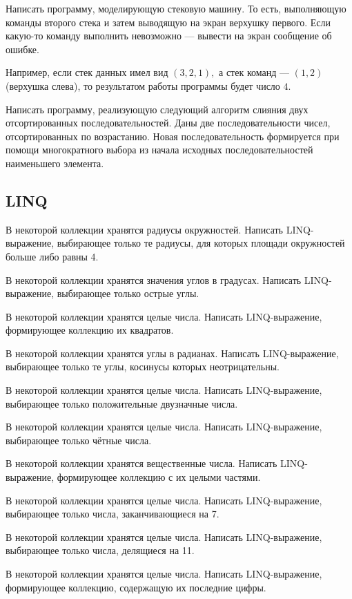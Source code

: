 Написать программу, моделирующую стековую машину. То есть, выполняющую команды второго стека и затем выводящую
на экран верхушку первого. Если какую-то команду выполнить невозможно
— вывести на экран сообщение об ошибке.

Например, если стек данных имел вид $(3, 2, 1),$ а стек команд —
$(1, 2)$ (верхушка слева), то результатом работы программы будет число
$4$.

\task Написать программу, реализующую следующий алгоритм слияния двух
отсортированных последовательностей. Даны две последовательности
чисел, отсортированных по возрастанию. Новая последовательность
формируется при помощи многократного выбора из начала исходных
последовательностей наименьшего элемента.


\subsection{LINQ}

\task В некоторой коллекции хранятся радиусы окружностей. Написать
LINQ-выражение, выбирающее только те радиусы, для которых площади
окружностей больше либо равны 4.

\task В некоторой коллекции хранятся значения углов в
градусах. Написать LINQ-выражение, выбирающее только острые углы.

\task В некоторой коллекции хранятся целые числа. Написать
LINQ-выражение, формирующее коллекцию их квадратов.

\task В некоторой коллекции хранятся углы в радианах. Написать
LINQ-выражение, выбирающее только те углы, косинусы которых
неотрицательны.

\task В некоторой коллекции хранятся целые числа. Написать
LINQ-выражение, выбирающее только положительные двузначные числа.

\task В некоторой коллекции хранятся целые числа. Написать
LINQ-выражение, выбирающее только чётные числа.

\task В некоторой коллекции хранятся вещественные числа. Написать
LINQ-выражение, формирующее коллекцию с их целыми частями.

\task В некоторой коллекции хранятся целые числа. Написать
LINQ-выражение, выбирающее только числа, заканчивающиеся на 7.

\task В некоторой коллекции хранятся целые числа. Написать
LINQ-выражение, выбирающее только числа, делящиеся на 11.

\task В некоторой коллекции хранятся целые числа. Написать
LINQ-выражение, формирующее коллекцию, содержащую их последние цифры.

